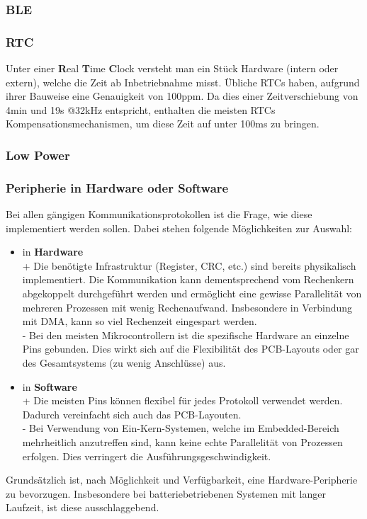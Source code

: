 \documentclass[12pt]{article}
\begin{document}
	\subsubsection{BLE}
	\subsubsection{RTC}
	Unter einer \textbf{R}eal \textbf{T}ime \textbf{C}lock versteht man ein Stück Hardware (intern oder extern), welche die Zeit ab Inbetriebnahme misst. Übliche RTCs haben, aufgrund ihrer Bauweise eine Genauigkeit von 100ppm. Da dies einer Zeitverschiebung von 4min und 19s @32kHz entspricht, enthalten die meisten RTCs Kompensationsmechanismen, um diese Zeit auf unter 100ms zu bringen. \cite{dighe_tps65950_2008}
	\subsubsection{Low Power}
	\subsubsection{Peripherie in Hardware oder Software}
	Bei allen gängigen Kommunikationsprotokollen ist die Frage, wie diese implementiert werden sollen. Dabei stehen folgende Möglichkeiten zur Auswahl:
	\begin{itemize}
		\item in \textbf{Hardware} \\
		+ Die benötigte Infrastruktur (Register, CRC, etc.) sind bereits physikalisch implementiert. Die Kommunikation kann dementsprechend vom Rechenkern abgekoppelt durchgeführt werden und ermöglicht eine gewisse Parallelität von mehreren Prozessen mit wenig Rechenaufwand. Insbesondere in Verbindung mit DMA, kann so viel Rechenzeit eingespart werden. \\
		- Bei den meisten Mikrocontrollern ist die spezifische Hardware an einzelne Pins gebunden. Dies wirkt sich auf die Flexibilität des PCB-Layouts oder gar des Gesamtsystems (zu wenig Anschlüsse) aus.
		\item in \textbf{Software} \\
		+ Die meisten Pins können flexibel für jedes Protokoll verwendet werden. Dadurch vereinfacht sich auch das PCB-Layouten.\\
		- Bei Verwendung von Ein-Kern-Systemen, welche im Embedded-Bereich mehrheitlich anzutreffen sind, kann keine echte Parallelität von Prozessen erfolgen. Dies verringert die Ausführungsgeschwindigkeit.
	\end{itemize}
	Grundsätzlich ist, nach Möglichkeit und Verfügbarkeit, eine Hardware-Peripherie zu bevorzugen. Insbesondere bei batteriebetriebenen Systemen mit langer Laufzeit, ist diese ausschlaggebend.
\end{document}
